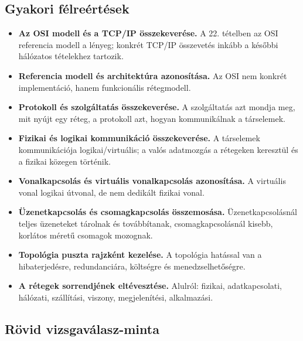 \subsection{Gyakori félreértések}

\begin{itemize}
  \item \textbf{Az OSI modell és a TCP/IP összekeverése.} A 22. tételben az OSI referencia modell a lényeg; konkrét TCP/IP összevetés inkább a későbbi hálózatos tételekhez tartozik.
  \item \textbf{Referencia modell és architektúra azonosítása.} Az OSI nem konkrét implementáció, hanem funkcionális rétegmodell.
  \item \textbf{Protokoll és szolgáltatás összekeverése.} A szolgáltatás azt mondja meg, mit nyújt egy réteg, a protokoll azt, hogyan kommunikálnak a társelemek.
  \item \textbf{Fizikai és logikai kommunikáció összekeverése.} A társelemek kommunikációja logikai/virtuális; a valós adatmozgás a rétegeken keresztül és a fizikai közegen történik.
  \item \textbf{Vonalkapcsolás és virtuális vonalkapcsolás azonosítása.} A virtuális vonal logikai útvonal, de nem dedikált fizikai vonal.
  \item \textbf{Üzenetkapcsolás és csomagkapcsolás összemosása.} Üzenetkapcsolásnál teljes üzeneteket tárolnak és továbbítanak, csomagkapcsolásnál kisebb, korlátos méretű csomagok mozognak.
  \item \textbf{Topológia puszta rajzként kezelése.} A topológia hatással van a hibaterjedésre, redundanciára, költségre és menedzselhetőségre.
  \item \textbf{A rétegek sorrendjének eltévesztése.} Alulról: fizikai, adatkapcsolati, hálózati, szállítási, viszony, megjelenítési, alkalmazási.
\end{itemize}

\subsection{Rövid vizsgaválasz-minta}


